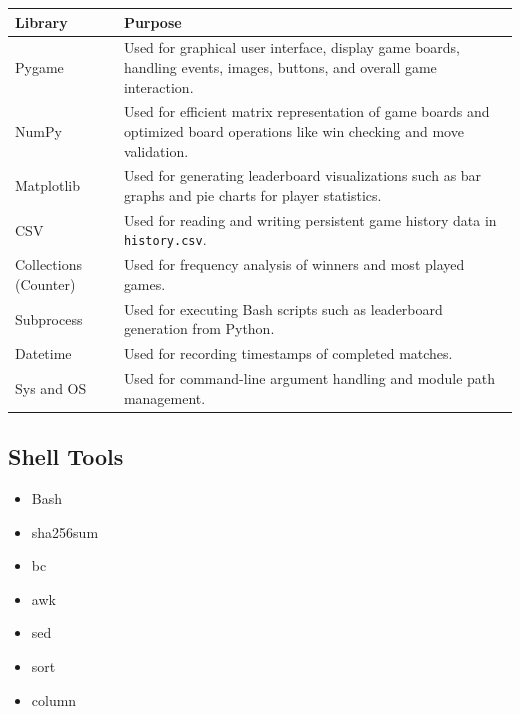 \documentclass[12pt,a4paper]{article}
\begin{document}
\begin{longtable}{|p{4cm}|p{9cm}|}
\hline
\textbf{Library} & \textbf{Purpose} \\
\hline

Pygame & Used for graphical user interface, display game boards, handling events, images, buttons, and overall game interaction. \\
\hline

NumPy & Used for efficient matrix representation of game boards and optimized board operations like win checking and move validation. \\
\hline

Matplotlib & Used for generating leaderboard visualizations such as bar graphs and pie charts for player statistics. \\
\hline

CSV & Used for reading and writing persistent game history data in \texttt{history.csv}. \\
\hline

Collections (Counter) & Used for frequency analysis of winners and most played games. \\
\hline

Subprocess & Used for executing Bash scripts such as leaderboard generation from Python. \\
\hline

Datetime & Used for recording timestamps of completed matches. \\
\hline

Sys and OS & Used for command-line argument handling and module path management. \\
\hline

\end{longtable}

\subsection{Shell Tools}

\begin{itemize}
    \item Bash
    \item sha256sum
    \item bc
    \item awk
    \item sed
    \item sort
    \item column
\end{itemize}

\end{document}

